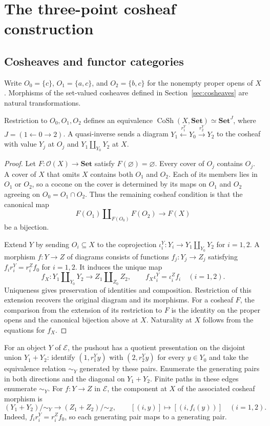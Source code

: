 \section{The three-point cosheaf construction}\label{app:fork-structure}

\subsection{Cosheaves and functor categories}

Write $O_0=\{c\}$, $O_1=\{a,c\}$, and $O_2=\{b,c\}$ for the nonempty
proper opens of $X$. Morphisms of the set-valued cosheaves defined in
Section~\ref{sec:cosheaves} are natural transformations.

\begin{proposition}\label{prop:fork-cosheaves}
Restriction to $O_0,O_1,O_2$ defines an equivalence
$\operatorname{CoSh}(X,\mathbf{Set})\simeq\mathbf{Set}^{J}$,
where $J=(1\leftarrow0\to2)$. A quasi-inverse sends a diagram
$Y_1\xleftarrow{r_1^Y}Y_0\xrightarrow{r_2^Y}Y_2$ to the cosheaf
with value $Y_j$ at $O_j$ and $Y_1\amalg_{Y_0}Y_2$ at $X$.
\end{proposition}
\begin{proof}
Let $F:\mathcal O(X)\to\mathbf{Set}$ satisfy $F(\varnothing)=\varnothing$.
Every cover of $O_j$ contains $O_j$. A cover of $X$ that omits $X$
contains both $O_1$ and $O_2$. Each of its members lies in $O_1$
or $O_2$, so a cocone on the cover is determined
by its maps on $O_1$ and $O_2$ agreeing on $O_0=O_1\cap O_2$.
Thus the remaining cosheaf condition is that the canonical map
\[
 F(O_1)\amalg_{F(O_0)}F(O_2)\longrightarrow F(X)
\]
be a bijection.

Extend $Y$ by sending $O_i\subseteq X$ to the coprojection
$\iota_i^Y:Y_i\to Y_1\amalg_{Y_0}Y_2$ for $i=1,2$. A morphism $f:Y\to Z$ of diagrams consists of functions
$f_j:Y_j\to Z_j$ satisfying $f_i r_i^Y=r_i^Z f_0$ for $i=1,2$.
It induces the unique map
\[
 f_X:Y_1\amalg_{Y_0}Y_2\longrightarrow Z_1\amalg_{Z_0}Z_2,
 \qquad f_X\iota_i^Y=\iota_i^Z f_i\quad(i=1,2).
\]
Uniqueness gives preservation of identities and composition.
Restriction of this extension recovers the original diagram and
its morphisms. For a cosheaf $F$, the comparison from the extension
of its restriction to $F$ is the identity on the proper opens and
the canonical bijection above at $X$. Naturality at $X$ follows
from the equations for $f_X$.
\end{proof}

For an object $Y$ of $\mathcal E$, the pushout has a
quotient presentation on the disjoint union $Y_1+Y_2$: identify
$(1,r_1^Yy)$ with $(2,r_2^Yy)$ for every $y\in Y_0$ and take the
equivalence relation $\sim_Y$ generated by these pairs. Enumerate the
generating pairs in both directions and the diagonal on $Y_1+Y_2$.
Finite paths in these edges enumerate $\sim_Y$.
For $f:Y\to Z$ in $\mathcal E$, the component at $X$ of the associated
cosheaf morphism is
\[
 (Y_1+Y_2)/{\sim_Y}\longrightarrow (Z_1+Z_2)/{\sim_Z},\qquad
 [(i,y)]\longmapsto [(i,f_i(y))]\quad(i=1,2).
\]
Indeed, $f_i r_i^Y=r_i^Z f_0$, so each generating pair maps to a
generating pair.


